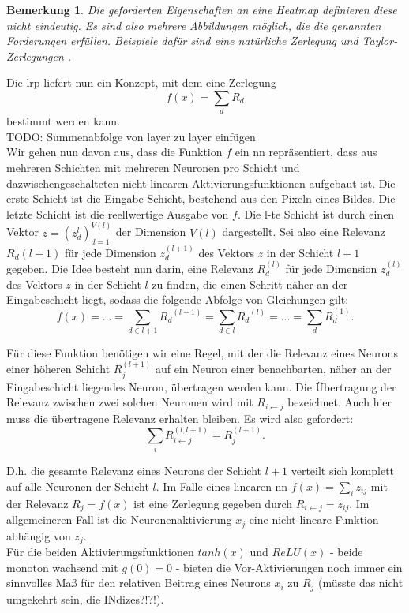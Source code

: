 \documentclass[twoside, 12pt,a4paper]{article}
\newtheorem{remark}[theorem]{Bemerkung}
\numberwithin{equation}{section}
\begin{document}
\begin{remark}
	Die geforderten Eigenschaften an eine Heatmap definieren diese nicht eindeutig. Es sind also mehrere Abbildungen möglich, die die genannten Forderungen erfüllen. Beispiele dafür sind eine natürliche Zerlegung und Taylor-Zerlegungen \cite{dtd_paper}.
\end{remark}

Die \gls{lrp} liefert nun ein Konzept, mit dem eine Zerlegung 
\begin{equation}
	f(x) = \sum_dR_d
\end{equation}
bestimmt werden kann.\\
TODO: Summenabfolge von layer zu layer einfügen\\


Wir gehen nun davon aus, dass die Funktion $f$ ein \gls{nn} repräsentiert, dass aus mehreren Schichten mit mehreren Neuronen pro Schicht und dazwischengeschalteten nicht-linearen Aktivierungsfunktionen aufgebaut ist.
Die erste Schicht ist die Eingabe-Schicht, bestehend aus den Pixeln eines Bildes. Die letzte Schicht ist die reellwertige Ausgabe von $f$. Die l-te Schicht ist durch einen Vektor $z = (z_d^{l})_{d=1}^{V(l)}$ der Dimension $V(l)$ dargestellt. Sei also eine Relevanz $R_d{(l+1)}$ für jede Dimension $z_d^{(l+1)}$ des Vektors $z$ in der Schicht $l+1$ gegeben. Die Idee besteht nun darin, eine Relevanz $R_d^{(l)}$ für jede Dimension $z_d^{(l)}$ des Vektors $z$ in der Schicht $l$ zu finden, die einen Schritt näher an der Eingabeschicht liegt, sodass die folgende Abfolge von Gleichungen gilt:
\begin{equation}
	f(x) = ... = \sum_{d\in l+1}{R_d}^{(l+1)} = \sum_{d\in l}{R_d}^{(l)} = ... = \sum_d{R_d^{(1)}}.\label{erhaltungseigenschaft}
\end{equation}


Für diese Funktion benötigen wir eine Regel, mit der die Relevanz eines Neurons einer höheren Schicht $R_j^{(l+1)}$ auf ein Neuron einer benachbarten, näher an der Eingabeschicht liegendes Neuron, übertragen werden kann.
Die Übertragung der Relevanz zwischen zwei solchen Neuronen wird mit $R_{i\leftarrow j}$ bezeichnet. Auch hier muss die übertragene Relevanz erhalten bleiben. Es wird also gefordert:
\begin{equation}
	\sum_i{R_{i\leftarrow j}^{(l,l+1)}} = R_j^{(l+1)}.
\end{equation}

D.h. die gesamte Relevanz eines Neurons der Schicht $l+1$ verteilt sich komplett auf alle Neuronen der Schicht $l$.
Im Falle eines linearen \gls{nn} $f(x) = \sum_i{z_{ij}}$ mit der Relevanz $R_j = f(x)$ ist eine Zerlegung gegeben durch $R_{i\leftarrow j} = z_{ij}.$
Im allgemeineren Fall ist die Neuronenaktivierung $x_j$ eine nicht-lineare Funktion abhängig von $z_j$.\\
Für die beiden Aktivierungsfunktionen $tanh(x)$ und $ReLU(x)$ - beide monoton wachsend mit $g(0)=0$ - bieten die Vor-Aktivierungen noch immer ein sinnvolles Maß für den relativen Beitrag eines Neurons $x_i$ zu $R_j$ (müsste das nicht umgekehrt sein, die INdizes?!?!).
\end{document}
